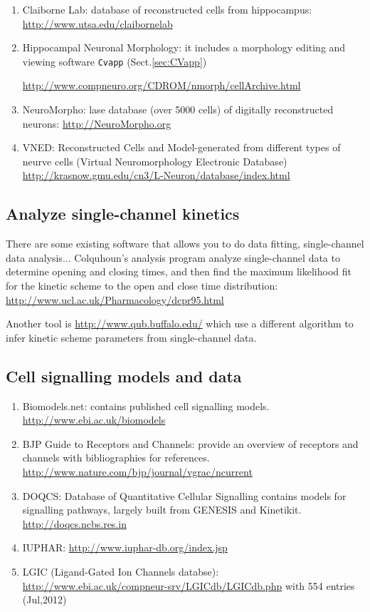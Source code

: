 \begin{enumerate}
  \item Claiborne Lab: database of reconstructed cells from hippocampus:
  \url{http://www.utsa.edu/claibornelab}

  \item Hippocampal Neuronal Morphology: it includes a morphology editing and
  viewing software \verb!Cvapp! (Sect.\ref{sec:CVapp})

  \url{http://www.compneuro.org/CDROM/nmorph/cellArchive.html}
  \item NeuroMorpho: lase database (over 5000 cells)
  of digitally reconstructed neurons: \url{http://NeuroMorpho.org}
  \item VNED:
  Reconstructed
  Cells and
  Model-generated
  from different
  types of neurve
  cells (Virtual
  Neuromorphology
  Electronic
  Database) \url{http://krasnow.gmu.edu/cn3/L-Neuron/database/index.html}
\end{enumerate}

\subsection{Analyze single-channel kinetics}

There are some existing software that allows you to do data fitting,
single-channel data analysis... Colquhoun's analysis program
\citep{colquhoun1996} analyze single-channel data to determine opening and
closing times, and then find the maximum likelihood fit for the kinetic scheme
to the open and close time distribution:
\url{http://www.ucl.ac.uk/Pharmacology/dcpr95.html}

Another tool is \url{http://www.qub.buffalo.edu/} which use a different
algorithm \citep{qin1996} to infer kinetic scheme parameters from single-channel
data.

\subsection{Cell signalling models and data}

\begin{enumerate}
  \item Biomodels.net: contains published cell signalling models.
  \url{http://www.ebi.ac.uk/biomodels}
  \item BJP Guide to Receptors and Channels: provide an overview of receptors
  and channels with bibliographies for references.
  \url{http://www.nature.com/bjp/journal/vgrac/ncurrent}
  \item DOQCS: Database of Quantitative Cellular Signalling contains models for
  signalling pathways, largely built from GENESIS and Kinetikit.
  \url{http://doqcs.ncbs.res.in}
  \item IUPHAR: \url{http://www.iuphar-db.org/index.jsp}

  \item LGIC (Ligand-Gated Ion Channels databse):
  \url{http://www.ebi.ac.uk/compneur-srv/LGICdb/LGICdb.php} with 554 entries
  (Jul,2012)
\end{enumerate}

